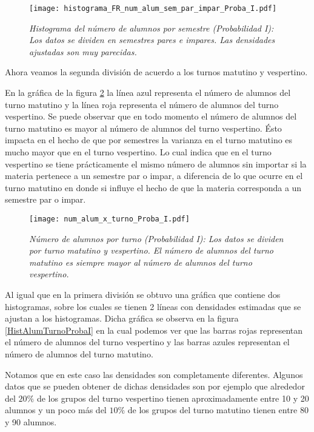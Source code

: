 \begin{figure}[h]
\centering
\texttt{[image: histograma\_FR\_num\_alum\_sem\_par\_impar\_Proba\_I.pdf]} %
\caption[\textit{Histograma del número de alumnos por semestre: Probabilidad I}]{\textit{Histograma del número de alumnos por semestre (Probabilidad I): Los datos se dividen en semestres pares e impares. Las densidades ajustadas son muy parecidas.}}\label{HistAlumParImparProbaI}
\end{figure}


Ahora veamos la segunda división de acuerdo a los turnos matutino y vespertino.

En la gráfica de la figura \ref{num_alum_x_turno_Proba_I} la línea azul representa el número de alumnos del turno matutino y la línea roja representa el número de alumnos del turno vespertino. Se puede observar que en todo momento el número de alumnos del turno matutino es mayor al número de alumnos del turno vespertino. Ésto impacta en el hecho de que por semestres la varianza en el turno matutino es mucho mayor que en el turno vespertino. Lo cual indica que en el turno vespertino se tiene prácticamente el mismo número de alumnos sin importar si la materia pertenece a un semestre par o impar, a diferencia de lo que ocurre en el turno matutino en donde si influye el hecho de que la materia corresponda a un semestre par o impar.


\begin{figure}[h]
\centering
\texttt{[image: num\_alum\_x\_turno\_Proba\_I.pdf]} %
\caption[\textit{Número de alumnos por turno: Probabilidad I}]{\textit{Número de alumnos por turno (Probabilidad I): Los datos se dividen por turno matutino y vespertino. El número de alumnos del turno matutino es siempre mayor al número de alumnos del turno vespertino.}}\label{num_alum_x_turno_Proba_I}
\end{figure}

Al igual que en la primera división se obtuvo una gráfica que contiene dos histogramas, sobre los cuales se tienen 2 líneas con  densidades estimadas que se ajustan a los histogramas. Dicha gráfica se observa en la figura \ref{HistAlumTurnoProbaI} en la cual podemos ver que las barras rojas representan el número de alumnos del turno vespertino y las barras azules representan el número de alumnos del turno matutino.

Notamos que en este caso las densidades son completamente diferentes. Algunos datos que se pueden obtener de dichas densidades son por ejemplo que alrededor del $20\%$ de los grupos del turno vespertino tienen aproximadamente entre 10 y 20 alumnos y un poco más del $10\%$ de los grupos del turno matutino tienen entre 80 y 90 alumnos.

